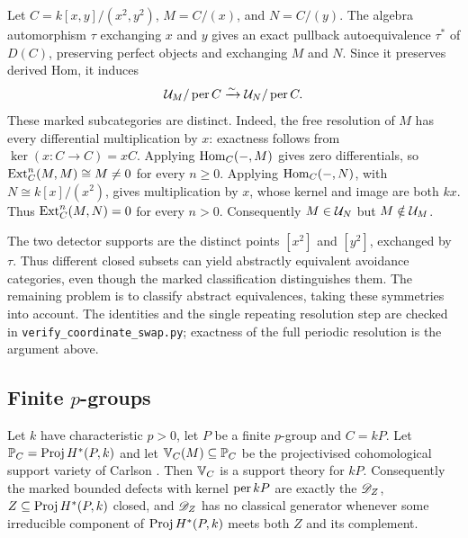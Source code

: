\begin{example}\label{ex:support-symmetry}
Let \(C=k[x,y]/(x^2,y^2)\), \(M=C/(x)\), and \(N=C/(y)\). The algebra automorphism \(\tau\) exchanging \(x\) and \(y\) gives an exact pullback autoequivalence \(\tau^*\) of \(D(C)\), preserving perfect objects and exchanging \(M\) and \(N\). Since it preserves derived Hom, it induces
\[
 \mathcal U_M/\operatorname{per} C\xrightarrow{\sim}\mathcal U_N/\operatorname{per} C.
\]
These marked subcategories are distinct. Indeed, the free resolution of \(M\) has every differential multiplication by \(x\): exactness follows from \(\ker(x:C\to C)=xC\). Applying \(\operatorname{Hom}_C(-,M)\) gives zero differentials, so \(\operatorname{Ext}_C^n(M,M)\cong M\ne0\) for every \(n\ge0\). Applying \(\operatorname{Hom}_C(-,N)\), with \(N\cong k[x]/(x^2)\), gives multiplication by \(x\), whose kernel and image are both \(kx\). Thus \(\operatorname{Ext}_C^n(M,N)=0\) for every \(n>0\). Consequently \(M\in\mathcal U_N\) but \(M\notin\mathcal U_M\).

The two detector supports are the distinct points \([x^2]\) and \([y^2]\), exchanged by \(\tau\). Thus different closed subsets can yield abstractly equivalent avoidance categories, even though the marked classification distinguishes them. The remaining problem is to classify abstract equivalences, taking these symmetries into account. The identities and the single repeating resolution step are checked in \texttt{verify\_coordinate\_swap.py}; exactness of the full periodic resolution is the argument above.
\end{example}

\subsection{Finite \texorpdfstring{\(p\)}{p}-groups}

\begin{theorem}[\(p\)-groups]\label{thm:pgroup}
Let \(k\) have characteristic \(p>0\), let \(P\) be a finite \(p\)-group and \(C=kP\).  Let \(\mathbb P_C=\operatorname{Proj} H^*(P,k)\) and let \(\mathbb V_C(M)\subseteq\mathbb P_C\) be the projectivised cohomological support variety of Carlson \cite{Carlson83}.  Then \(\mathbb V_C\) is a support theory for \(kP\).  Consequently the marked bounded defects with kernel \(\operatorname{per} kP\) are exactly the \(\mathscr D_Z\), \(Z\subseteq\operatorname{Proj} H^*(P,k)\) closed, and \(\mathscr D_Z\) has no classical generator whenever some irreducible component of \(\operatorname{Proj} H^*(P,k)\) meets both \(Z\) and its complement.
\end{theorem}

